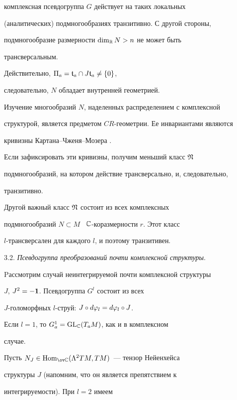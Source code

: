 комплексная псевдогруппа $G$ действует на таких локальных


(аналитических) подмногообразиях транзитивно. С другой стороны,


подмногообразие размерности $\dim_{{\Bbb R}} N>n$ не может быть


трансверсальным.


Действительно,  $\Pi_a={\frak t}_a\cap J{\frak t}_a\ne\{0\}$,


следовательно, $N$ обладает внутренней геометрией.





Изучение многообразий $N$, наделенных распределением с комплексной


структурой, является предметом $CR$-геометрии. Ее инвариантами являются


кривизны Картана--Чженя--Мозера \cite{CM}.


Если зафиксировать эти кривизны, получим меньший класс $\frak{N}$


подмногообразий, на котором действие трансверсально, и, следовательно,


транзитивно.





Другой важный класс $\frak{N}$ состоит из всех комплексных


подмногообразий $N\subset M$ \ ${\Bbb C}$-ко\-раз\-мер\-но\-сти $r$. Этот класс


$l$-трансверсален для каждого $l$, и поэтому транзитивен.


\medskip





3.2. {\it Псевдогруппа преобразований почти комплексной структуры}.


Pассмотрим случай неинтегрируемой почти комплексной структуры


$J$, $J^2=-\bold 1$. Псевдогруппа $G^l$ состоит из всех


$J$-голоморфных $l$-струй: $J\circ d\varphi_l=d\varphi_l\circ J$.


Если $l=1$, то $G^1_a=\operatorname{GL}_{\Bbb C}(T_aM)$, как и в комплексном


случае.





Пусть $N_J\in\Hom_{\ov\CC}(\La^2TM,TM)$~--- тензор Нейенхейса


структуры $J$ (напомним, что он является препятствием к


интегрируемости). При $l=2$ имеем


